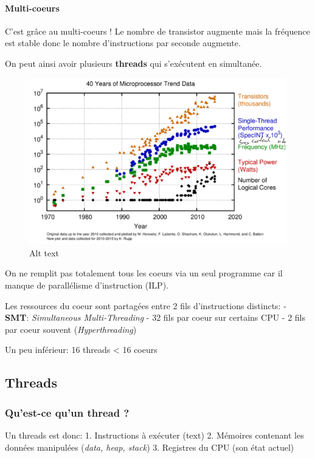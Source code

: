 \paragraph{Multi-coeurs}\label{multi-coeurs}

C'est grâce au multi-coeurs ! Le nombre de transistor augmente mais la
fréquence est stable donc le nombre d'instructions par seconde augmente.

On peut ainsi avoir plusieurs \textbf{threads} qui s'exécutent en
simultanée.

\begin{figure}
\centering
\includegraphics{image-23.png}
\caption{Alt text}
\end{figure}

On ne remplit pas totalement tous les coeurs via un seul programme car
il manque de parallélisme d'instruction (ILP).

Les ressources du coeur sont partagées entre 2 fils d'instructions
distincts: - \textbf{SMT}: \emph{Simultaneous Multi-Threading} - 32 fils
par coeur sur certains CPU - 2 fils par coeur souvent
(\emph{Hyperthreading})

Un peu inférieur: 16 threads \textless{} 16 coeurs

\subsection{Threads}\label{threads}

\subsubsection{Qu'est-ce qu'un thread ?}\label{quest-ce-quun-thread}

Un threads est donc: 1. Instructions à exécuter (text) 2. Mémoires
contenant les données manipulées (\emph{data, heap, stack}) 3. Registres
du CPU (son état actuel)

